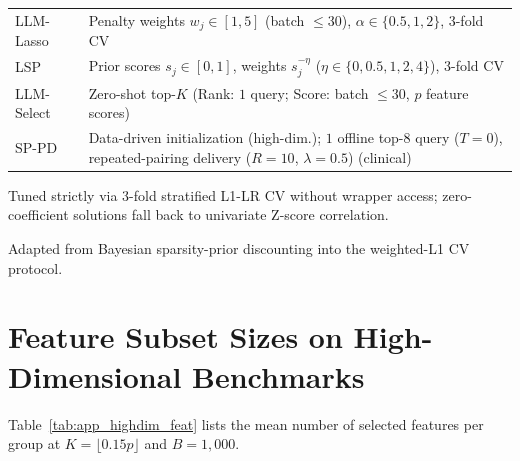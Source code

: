 \begin{table}[!htbp]
\begin{threeparttable}
\begin{tabular}{@{}l>{\raggedright\arraybackslash}p{6.15cm}@{}}
LLM-Lasso~\cite{zhang2025llmlasso} & Penalty weights $w_j \in [1, 5]$ (batch $\le 30$), $\alpha \in \{0.5, 1, 2\}$, 3-fold CV\tnote{a} \\
\addlinespace[2pt]
LSP~\cite{skinner2026lsp} & Prior scores $s_j \in [0, 1]$, weights $s_j^{-\eta}$ ($\eta \in \{0, 0.5, 1, 2, 4\}$), 3-fold CV\tnote{a,b} \\
\addlinespace[2pt]
LLM-Select~\cite{jeong2024llmselect} & Zero-shot top-$K$ (Rank: $1$ query; Score: batch $\le 30$, $p$ feature scores) \\
\addlinespace[2pt]
SP-PD & Data-driven initialization (high-dim.); $1$ offline top-8 query ($T = 0$), repeated-pairing delivery ($R = 10$, $\lambda = 0.5$) (clinical) \\
\bottomrule
\end{tabular}
\begin{tablenotes}[flushleft]
\scriptsize
\item[a] Tuned strictly via 3-fold stratified L1-LR CV without wrapper access; zero-coefficient solutions fall back to univariate Z-score correlation.
\item[b] Adapted from Bayesian sparsity-prior discounting into the weighted-L1 CV protocol.
\end{tablenotes}
\end{threeparttable}
\end{table}

\section{Feature Subset Sizes on High-Dimensional Benchmarks}
\label{app:highdim_feat}

Table~\ref{tab:app_highdim_feat} lists the mean number of selected features per group at $K = \lfloor 0.15p \rfloor$ and $B = 1{,}000$.

